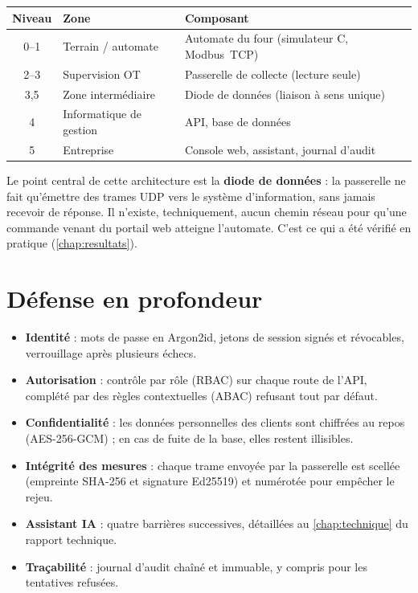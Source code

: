 \documentclass[11pt,a4paper]{report}
\begin{document}
\begin{center}
\begin{tabular}{@{}cll@{}}
\toprule
\textbf{Niveau} & \textbf{Zone} & \textbf{Composant} \\
\midrule
0--1 & Terrain / automate & Automate du four (simulateur C, Modbus~TCP) \\
2--3 & Supervision OT & Passerelle de collecte (lecture seule) \\
3,5 & Zone intermédiaire & Diode de données (liaison à sens unique) \\
4 & Informatique de gestion & API, base de données \\
5 & Entreprise & Console web, assistant, journal d'audit \\
\bottomrule
\end{tabular}
\end{center}

Le point central de cette architecture est la \textbf{diode de données} : la
passerelle ne fait qu'émettre des trames UDP vers le système d'information, sans
jamais recevoir de réponse. Il n'existe, techniquement, aucun chemin réseau pour
qu'une commande venant du portail web atteigne l'automate. C'est ce qui a été
vérifié en pratique (\cref{chap:resultats}).

\section{Défense en profondeur}
\begin{itemize}
  \item \textbf{Identité} : mots de passe en Argon2id, jetons de session signés
    et révocables, verrouillage après plusieurs échecs.
  \item \textbf{Autorisation} : contrôle par rôle (RBAC) sur chaque route de
    l'API, complété par des règles contextuelles (ABAC) refusant tout par
    défaut.
  \item \textbf{Confidentialité} : les données personnelles des clients sont
    chiffrées au repos (AES-256-GCM) ; en cas de fuite de la base, elles restent
    illisibles.
  \item \textbf{Intégrité des mesures} : chaque trame envoyée par la passerelle
    est scellée (empreinte SHA-256 et signature Ed25519) et numérotée pour
    empêcher le rejeu.
  \item \textbf{Assistant IA} : quatre barrières successives, détaillées au
    \cref{chap:technique} du rapport technique.
  \item \textbf{Traçabilité} : journal d'audit chaîné et immuable, y compris
    pour les tentatives refusées.
\end{itemize}
\end{document}
